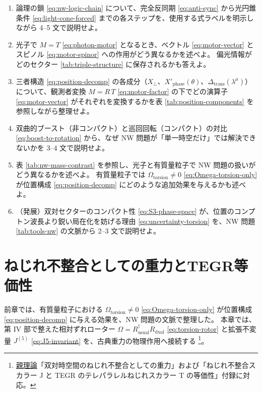 \documentclass[dvipdfmx,a4paper,oneside]{jsbook}
\numberwithin{equation}{chapter}
\begin{document}
\begin{enumerate}[leftmargin=2em]
  \item 論理の鎖 \eqref{eq:nw-logic-chain} について、完全反同期 \eqref{eq:anti-sync} から光円錐条件 \eqref{eq:light-cone-forced} までの各ステップを、使用する式ラベルを明示しながら 4--5 文で説明せよ。

  \item 光子で \(M = T\) \eqref{eq:photon-motor} となるとき、ベクトル \eqref{eq:motor-vector} とスピノル \eqref{eq:motor-spinor} への作用がどう異なるかを述べよ。
  偏光情報がどのセクター \eqref{tab:triple-structure} に保存されるかも答えよ。

  \item 三者構造 \eqref{eq:position-decomp} の各成分（\(X_\perp\)、\(X'_{\mathrm{phase}}(\theta)\)、\(\Delta_{\mathrm{trans}}(\lambda^\mu)\)）について、観測者変換 \(M = R\,T\) \eqref{eq:motor-factor} の下でどの演算子 \eqref{eq:motor-vector} がそれぞれを変換するかを表 \ref{tab:position-components} を参照しながら整理せよ。

  \item 双曲的ブースト（非コンパクト）と巡回回転（コンパクト）の対比 \eqref{eq:boost-to-rotation} から、なぜ NW 問題が「単一時空だけ」では解決できないかを 3--4 文で説明せよ。

  \item 表 \ref{tab:nw-mass-contrast} を参照し、光子と有質量粒子で NW 問題の扱いがどう異なるかを述べよ。
  有質量粒子では \(\Omega_{\mathrm{torsion}} \neq 0\) \eqref{eq:Omega-torsion-only} が位置構成 \eqref{eq:position-decomp} にどのような追加効果を与えるかも述べよ。

  \item （発展）双対セクターのコンパクト性 \eqref{eq:S3-phase-space} が、位置のコンプトン波長より鋭い局在化を妨げる理由 \eqref{eq:uncertainty-torsion} を、NW 問題 \eqref{tab:tools-nw} の文脈から 2--3 文で説明せよ。
\end{enumerate}

\chapter{ねじれ不整合としての重力とTEGR等価性}

前章では、有質量粒子における \(\Omega_{\mathrm{torsion}} \neq 0\) \eqref{eq:Omega-torsion-only} が位置構成 \eqref{eq:position-decomp} に与える効果を、NW 問題の文脈で整理した。
本章では、第 IV 部で整えた相対ずれローター \(\Omega = R_{\mathrm{usual}}^\dagger R_{\mathrm{dual}}\) \eqref{eq:torsion-rotor} と拡張不変量 \(J^{(5)}\) \eqref{eq:J5-invariant} を、古典重力の物理作用へ接続する \footnote{\hyperref[sec:sister-manuscripts]{親理論}「双対時空間のねじれ不整合としての重力」および「ねじれ不整合スカラー J と TEGR のテレパラレルねじれスカラー T の等価性」付録に対応。}。
\end{document}
